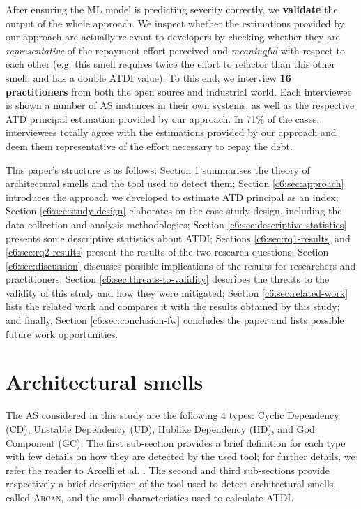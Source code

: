 After ensuring the ML model is predicting severity correctly, we \textbf{validate} the output of the whole approach. 
We inspect whether the estimations provided by our approach are actually relevant to developers by checking whether they are \emph{representative} of the repayment effort perceived and \emph{meaningful} with respect to each other (e.g. this smell requires twice the effort to refactor than this other smell, and has a double ATDI value).
To this end, we interview \textbf{16 practitioners} from both the open source and industrial world.
Each interviewee is shown a number of AS instances in their own systems, as well as the respective ATD principal estimation provided by our approach.
In 71\% of the cases, interviewees totally agree with the estimations provided by our approach and deem them representative of the effort necessary to repay the debt.

This paper's structure is as follows:
Section \ref{c6:sec:AS} summarises the theory of architectural smells and the tool used to detect them; Section \ref{c6:sec:approach} introduces the approach we developed to estimate ATD principal as an index; Section \ref{c6:sec:study-design} elaborates on the case study design, including the data collection and analysis methodologies; Section \ref{c6:sec:descriptive-statistics} presents some descriptive statistics about ATDI; Sections \ref{c6:sec:rq1-results} and \ref{c6:sec:rq2-results}  present the results of the two research questions; Section \ref{c6:sec:discussion} discusses possible implications of the results for researchers and practitioners; Section \ref{c6:sec:threats-to-validity} describes the threats to the validity of this study and how they were mitigated; Section \ref{c6:sec:related-work} lists the related work and compares it with the results obtained by this study; and finally, Section \ref{c6:sec:conclusion-fw} concludes the paper and lists possible future work opportunities.


\section{Architectural smells}\label{c6:sec:AS}
The AS considered in this study are the following 4 types: Cyclic Dependency (CD), Unstable Dependency (UD), Hublike Dependency (HD), and God Component (GC).
The first sub-section provides a brief definition for each type with few details on how they are detected by the used tool; for further details, we refer the reader to Arcelli et al. \cite{Arcelli2016}. 
The second and third sub-sections provide respectively a brief description of the tool used to detect architectural smells, called \textsc{Arcan}, and the smell characteristics used to calculate ATDI. 

